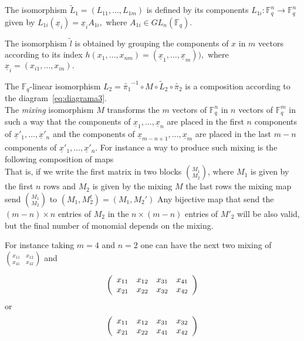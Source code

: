 \documentclass[12pt,a4paper]{amsart}
\theoremstyle{remark}
\theoremstyle{definition}
\newcommand\gfq{\mathbb{F}_q}
\begin{document}
The isomorphism $\tilde{L}_1=(L_{11},\ldots,L_{1m})$  is defined by its components $L_{1i}:\mathbb{F}_{q}^n\to\mathbb{F}_{q}^n$
given by $L_{1i}(\underline{x}_i)=\underline{x}_i A_{1i},$ where $A_{1i}\in GL_n (\mathbb{F}_{q}).$

The isomorphism  $\tilde{ l}$ is obtained by grouping the components of $x$ in $m$ vectors 
according to its index $h(x_1,\ldots,x_{nm})= (\underline{x}_1,\ldots,\underline{x}_m )),$ where 
$\underline{x}_i=(x_{i1},\ldots, x_{in}).$

The $\gfq$-linear isomorphism $L_2=\tilde{\pi_1}^{-1}\circ M \circ \tilde{ L}_2\circ \tilde{\pi_2}$ 
is a composition according to the diagram~\eqref{eq:diagrama3}.
\begin{equation}
\label{eq:diagrama3}

\end{equation}
The \emph{mixing} isomorphism $M$ transforms the $m$ vectors of $\gfq^n$ in $n$ vectors of $\gfq^m$  in such a way that 
the components of $\underline{x}_1,\ldots,\underline{x}_n$ are  placed  in the first $n$ components of 
$\underline{x}'_1,\ldots, \underline{x}'_n$ and
the components of $\underline{x}_{m-n+1},\ldots,\underline{x}_m$ are placed in the last $m-n$ components of  
$\underline{x}'_1,\ldots, \underline{x}'_n$.
For instance a way to produce such mixing is the following
composition of maps 
\begin{equation}
\label{eq:diagrama4}

\end{equation}
That is, if we write the first matrix in two blocks  $\binom{M_1}{M_2}$, 
where $M_1$ is given by the first $n$ rows and $M_2$ is given by the mixing $M$ 
the last rows  the mixing map send  $\binom{M_1}{M_2} $ to $(M_1, M_2^t)=(M_1,M_2')$
Any bijective map that send the $(m-n)\times n$ entries of $M_2$ in the $n\times (m-n)$ entries of $M'_2$ will be also valid, 
but the final number of monomial depends on the mixing.

For instance taking $m=4$ and $n=2$ one can have the next two mixing of    
$\binom{ x_{11} \quad x_{12}}{x_{41} \quad x_{42} }$ and

\begin{equation}
\label{eq:mixing1}
\left(
\array{cccc}
x_{11} & x_{12} & x_{31} & x_{41}\\
x_{21} & x_{22} & x_{32} & x_{42}
\endarray
\right)
\end{equation}
or
\begin{equation}
\label{eq:mixing2}
\left(
\array{cccc}
x_{11} & x_{12} & x_{31} & x_{32}\\
x_{21} & x_{22} & x_{41} & x_{42}
\endarray
\right)
\end{equation}
\end{document}
